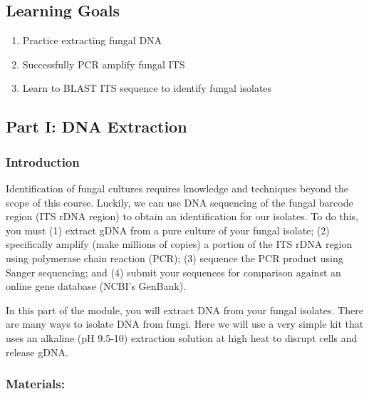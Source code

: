 \documentclass[
  letterpaper,
  DIV=11,
  numbers=noendperiod]{scrreprt}
\providecommand{\tightlist}{%
  \setlength{\itemsep}{0pt}\setlength{\parskip}{0pt}}
\begin{document}
\subsection*{Learning Goals}\label{learning-goals-2}

\begin{enumerate}
\def\labelenumi{\arabic{enumi}.}
\tightlist
\item
  Practice extracting fungal DNA
\item
  Successfully PCR amplify fungal ITS
\item
  Learn to BLAST ITS sequence to identify fungal isolates
\end{enumerate}

\subsection*{Part I: DNA Extraction}\label{part-i-dna-extraction}

\subsubsection*{Introduction}\label{introduction-3}

Identification of fungal cultures requires knowledge and techniques
beyond the scope of this course. Luckily, we can use DNA sequencing of
the fungal barcode region (ITS rDNA region) to obtain an identification
for our isolates. To do this, you must (1) extract gDNA from a pure
culture of your fungal isolate; (2) specifically amplify (make millions
of copies) a portion of the ITS rDNA region using polymerase chain
reaction (PCR); (3) sequence the PCR product using Sanger sequencing;
and (4) submit your sequences for comparison against an online gene
database (NCBI's GenBank).

In this part of the module, you will extract DNA from your fungal
isolates. There are many ways to isolate DNA from fungi. Here we will
use a very simple kit that uses an alkaline (pH 9.5-10) extraction
solution at high heat to disrupt cells and release gDNA.

\subsubsection*{Materials:}\label{materials}
\end{document}
